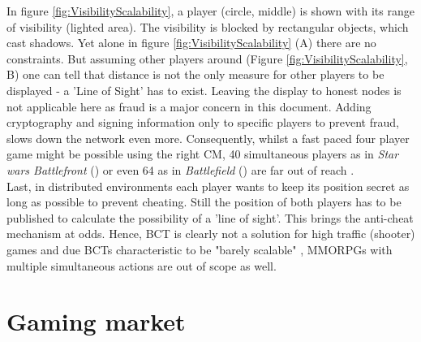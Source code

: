 In figure \ref{fig:VisibilityScalability}, a player (circle, middle) is shown with its range of visibility (lighted area).
The visibility is blocked by rectangular objects, which cast shadows.
Yet alone in figure \ref{fig:VisibilityScalability} (A) there are no constraints.
But assuming other players around (Figure \ref{fig:VisibilityScalability}, B) one can tell that distance is not the only measure for other players to be displayed - a 'Line of Sight' has to exist.
Leaving the display to honest nodes is not applicable here as fraud is a major concern in this document.
Adding cryptography and signing information only to specific players to prevent fraud, slows down the network even more.
Consequently, whilst a fast paced four player game might be possible using the right \gls{CM},
40 simultaneous players as in \textit{Star wars Battlefront} (\cite{Wikipedia.2021e})
or even 64 as in \textit{Battlefield} (\cite{Wikipedia.2021}) are far out of reach \cite[3]{Serada.2020}. \\
Last, in distributed environments each player wants to keep its position secret as long as possible to prevent cheating.
Still the position of both players has to be published to calculate the possibility of a 'line of sight'.
This brings the anti-cheat mechanism at odds.
Hence, \gls{BCT} is clearly not a solution for high traffic (shooter) games and
due \gls{BCT}s characteristic to be "barely scalable" \citet[19]{Serada.2020},
\gls{MMORPG}s with multiple simultaneous actions are out of scope as well.



\FloatBarrier

\section{Gaming market}
\label{sec:GamingMarket}

